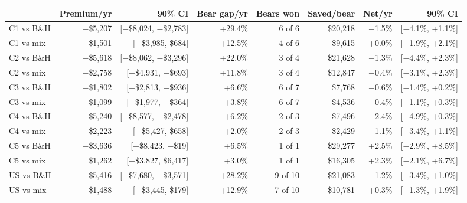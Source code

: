 \begin{tabular}{lrrrrrrr}
\toprule
 & Premium/yr & 90\% CI & Bear gap/yr & Bears won & Saved/bear & Net/yr & 90\% CI \\
\midrule
C1 vs B\&H & $-$\$5,207 & [$-$\$8,024, $-$\$2,783] & +29.4\% & 6 of 6 & \$20,218 & $-$1.5\% & [$-$4.1\%, +1.1\%] \\
C1 vs mix & $-$\$1,501 & [$-$\$3,985, \$684] & +12.5\% & 4 of 6 & \$9,615 & +0.0\% & [$-$1.9\%, +2.1\%] \\
C2 vs B\&H & $-$\$5,618 & [$-$\$8,062, $-$\$3,296] & +22.0\% & 3 of 4 & \$21,628 & $-$1.3\% & [$-$4.4\%, +2.3\%] \\
C2 vs mix & $-$\$2,758 & [$-$\$4,931, $-$\$693] & +11.8\% & 3 of 4 & \$12,847 & $-$0.4\% & [$-$3.1\%, +2.3\%] \\
C3 vs B\&H & $-$\$1,802 & [$-$\$2,813, $-$\$936] & +6.6\% & 6 of 7 & \$7,768 & $-$0.6\% & [$-$1.4\%, +0.2\%] \\
C3 vs mix & $-$\$1,099 & [$-$\$1,977, $-$\$364] & +3.8\% & 6 of 7 & \$4,536 & $-$0.4\% & [$-$1.1\%, +0.3\%] \\
C4 vs B\&H & $-$\$5,240 & [$-$\$8,577, $-$\$2,478] & +6.2\% & 2 of 3 & \$7,496 & $-$2.4\% & [$-$4.9\%, +0.3\%] \\
C4 vs mix & $-$\$2,223 & [$-$\$5,427, \$658] & +2.0\% & 2 of 3 & \$2,429 & $-$1.1\% & [$-$3.4\%, +1.1\%] \\
C5 vs B\&H & $-$\$3,636 & [$-$\$8,423, $-$\$19] & +6.5\% & 1 of 1 & \$29,277 & +2.5\% & [$-$2.9\%, +8.5\%] \\
C5 vs mix & \$1,262 & [$-$\$3,827, \$6,417] & +3.0\% & 1 of 1 & \$16,305 & +2.3\% & [$-$2.1\%, +6.7\%] \\
US vs B\&H & $-$\$5,416 & [$-$\$7,680, $-$\$3,571] & +28.2\% & 9 of 10 & \$21,083 & $-$1.2\% & [$-$3.4\%, +1.0\%] \\
US vs mix & $-$\$1,488 & [$-$\$3,445, \$179] & +12.9\% & 7 of 10 & \$10,781 & +0.3\% & [$-$1.3\%, +1.9\%] \\
\bottomrule
\end{tabular}
